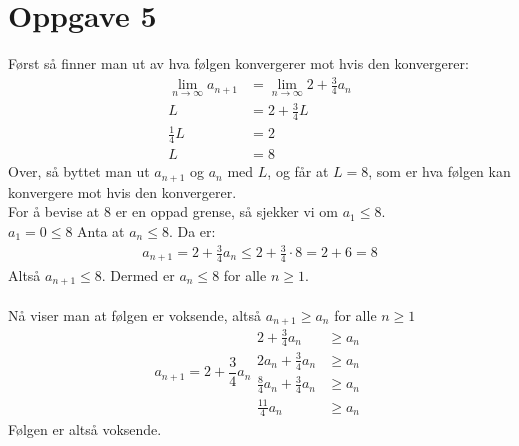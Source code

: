 \documentclass[12pt, a4paper]{article}
\begin{document}
\section*{Oppgave 5}
Først så finner man ut av hva følgen konvergerer mot hvis den konvergerer:
\begin{equation}
    \begin{split}
        \lim_{n \to \infty} a_{n+1} &= \lim_{n \to \infty} 2 + \frac{3}{4} a_n \\
        L &= 2 + \frac{3}{4} L \\
        \frac{1}{4} L &= 2\\
        L &= 8
    \end{split}
\end{equation}
Over, så byttet man ut $a_{n+1}$ og $a_n$ med $L$, og får at $L = 8$, som er hva følgen kan konvergere mot hvis den konvergerer. \\
For å bevise at $8$ er en oppad grense, så sjekker vi om $a_1 \leq 8$. \\
$a_1 = 0 \leq 8 $
Anta at $a_n \leq 8$. Da er:
\begin{equation}
    \begin{split}
        a_{n+1} = 2 + \frac{3}{4} a_n \leq 2 + \frac{3}{4} \cdot 8 = 2 + 6 = 8
    \end{split}
\end{equation}
Altså $a_{n+1} \leq 8$. Dermed er $a_n \leq 8$ for alle $n \geq 1$. \\ \\

Nå viser man at følgen er voksende, altså $a_{n+1} \geq a_n$ for alle $n \geq 1$
\begin{equation}
    a_{n+1} = 2 + \frac{3}{4}a_n
    \begin{split}
        2 + \frac{3}{4}a_n &\geq a_n \\
        2a_n + \frac{3}{4}a_n &\geq a_n \\
        \frac{8}{4}a_n + \frac{3}{4}a_n &\geq a_n \\
        \frac{11}{4}a_n &\geq a_n
    \end{split}
\end{equation}
Følgen er altså voksende.
\end{document}
